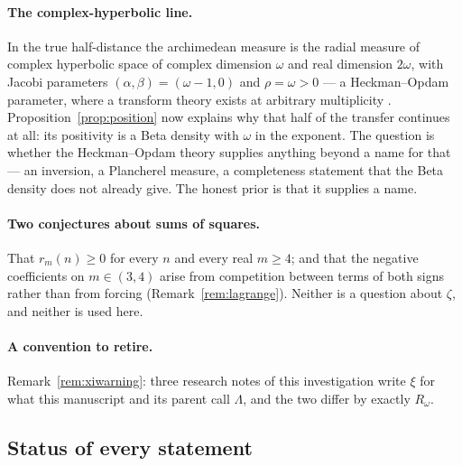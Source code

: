 \paragraph{The complex-hyperbolic line.} In the true half-distance the
archimedean measure is the radial measure of complex hyperbolic space of complex
dimension $\omega$ and real dimension $2\omega$, with Jacobi parameters
$(\alpha,\beta)=(\omega-1,0)$ and $\rho=\omega>0$ \cite{WhichDimension} --- a
Heckman--Opdam parameter, where a transform theory exists at arbitrary
multiplicity \cite{HeckmanSchlichtkrull}. Proposition~\ref{prop:position} now
explains why that half of the transfer continues at all: its positivity is a Beta
density with $\omega$ in the exponent. The question is whether the Heckman--Opdam
theory supplies anything beyond a name for that --- an inversion, a Plancherel
measure, a completeness statement that the Beta density does not already give.
The honest prior is that it supplies a name.

\paragraph{Two conjectures about sums of squares.} That $r_m(n)\ge0$ for every
$n$ and every real $m\ge4$; and that the negative coefficients on $m\in(3,4)$
arise from competition between terms of both signs rather than from forcing
(Remark~\ref{rem:lagrange}). Neither is a question about $\zeta$, and neither is
used here.

\paragraph{A convention to retire.} Remark~\ref{rem:xiwarning}: three research
notes of this investigation write $\xi$ for what this manuscript and its parent
call $\Lambda$, and the two differ by exactly $R_\omega$.

\subsection{Status of every statement}\label{sec:status}

